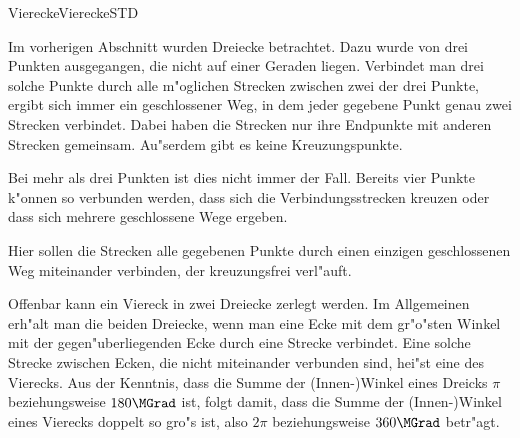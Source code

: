\begin{MXContent}{Vierecke}{Vierecke}{STD}

Im vorherigen Abschnitt  wurden Dreiecke betrachtet. 
Dazu wurde von drei Punkten ausgegangen, die nicht auf einer Geraden liegen. 
Verbindet man drei solche Punkte durch alle m"oglichen Strecken zwischen zwei 
der drei Punkte, ergibt sich immer ein geschlossener Weg, in dem jeder gegebene 
Punkt genau zwei Strecken verbindet. 
Dabei haben die Strecken nur ihre Endpunkte mit anderen Strecken gemeinsam. 
Au"serdem gibt es keine Kreuzungspunkte.

Bei mehr als drei Punkten ist dies nicht immer der Fall. Bereits vier Punkte 
k"onnen so verbunden werden, dass sich die Verbindungsstrecken kreuzen oder 
dass sich mehrere geschlossene Wege ergeben.

Hier sollen die Strecken alle gegebenen Punkte durch einen einzigen 
geschlossenen Weg miteinander verbinden, der kreuzungsfrei verl"auft.

\begin{center}
\end{center}

Offenbar kann ein Viereck in zwei Dreiecke zerlegt werden. Im Allgemeinen erh"alt
man die beiden Dreiecke, wenn man eine Ecke mit dem gr"o"sten Winkel mit der 
gegen"uberliegenden Ecke durch eine Strecke verbindet. Eine solche Strecke 
zwischen Ecken, die nicht miteinander verbunden sind, hei"st eine 
 des Vierecks. Aus der Kenntnis, dass 
die Summe der (Innen-)Winkel eines Dreicks $\pi$ beziehungsweise $180\MGrad$ ist,
folgt damit, dass die Summe der (Innen-)Winkel eines Vierecks doppelt so gro"s
ist, also $2 \pi$ beziehungsweise $360\MGrad$ betr"agt.


\end{MXContent}
